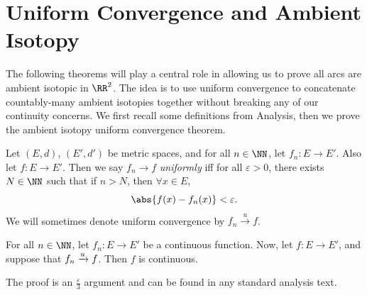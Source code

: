 \section{Uniform Convergence and Ambient Isotopy}
The following theorems will play a central role in allowing us to
prove all arcs are ambient isotopic in $\RR^2$. The idea is to use
uniform convergence to concatenate countably-many ambient isotopies
together without breaking any of our continuity concerns. We first
recall some definitions from Analysis, then we prove the ambient
isotopy uniform convergence theorem.
\begin{definition}
  Let $(E,d)$, $(E', d')$ be metric spaces, and for all $n \in \NN$,
  let $f_n : E \to E'$. Also let $f : E \to E'$. Then we say $f_n \to
  f$ \emph{uniformly} iff for all $\varepsilon > 0$, there exists $N
  \in \NN$ such that if $n > N$, then $\forall x \in E$,
  \[
    \abs{f(x) - f_n(x)} < \varepsilon.
  \]
  We will sometimes denote uniform convergence by $f_n \xrightarrow{u}
  f$.
\end{definition}
\begin{proposition}\label{prop:uniform-convergence}
  For all $n \in \NN$, let $f_n : E \to E'$ be a continuous function.
  Now, let $f : E \to E'$, and suppose that $f_n \xrightarrow{u} f$. Then $f$
  is continuous.
\end{proposition}
The proof is an $\frac{\varepsilon}{3}$ argument and can be found in
any standard analysis text.

